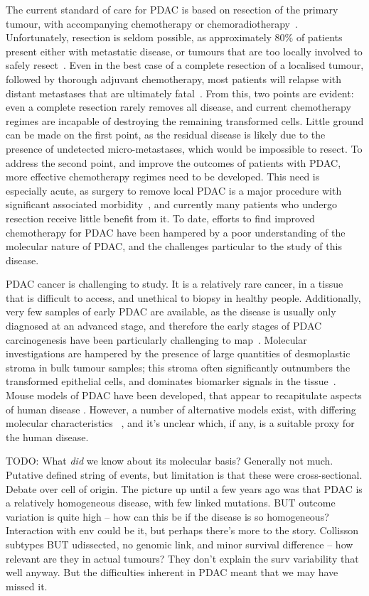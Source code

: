 \documentclass[thesis.tex]{subfiles}
\begin{document}
The current standard of care for \gls{PDAC} is based on resection of the primary tumour, with accompanying chemotherapy or chemoradiotherapy~\cite{Editors2015}.  Unfortunately, resection is seldom possible, as approximately $80\%$ of patients present either with metastatic disease, or tumours that are too locally involved to safely resect~\cite{TODO}.  Even in the best case of a complete resection of a localised tumour, followed by thorough adjuvant chemotherapy, most patients will relapse with distant metastases that are ultimately fatal~\cite{Barugola2007}.  From this, two points are evident: even a complete resection rarely removes all disease, and current chemotherapy regimes are incapable of destroying the remaining transformed cells.  Little ground can be made on the first point, as the residual disease is likely due to the presence of undetected micro-metastases, which would be impossible to resect.  To address the second point, and improve the outcomes of patients with \gls{PDAC}, more effective chemotherapy regimes need to be developed.  This need is especially acute, as surgery to remove local \gls{PDAC} is a major procedure with significant associated morbidity~\cite{Ho2005}, and currently many patients who undergo resection receive little benefit from it.  To date, efforts to find improved chemotherapy for \gls{PDAC} have been hampered by a poor understanding of the molecular nature of \gls{PDAC}, and the challenges particular to the study of this disease.

\gls{PDAC} cancer is challenging to study.  It is a relatively rare cancer, in a tissue that is difficult to access, and unethical to biopsy in healthy people.  Additionally, very few samples of early \gls{PDAC} are available, as the disease is usually only diagnosed at an advanced stage, and therefore the early stages of \gls{PDAC} carcinogenesis have been particularly challenging to map~\cite{TODO}.  Molecular investigations are hampered by the presence of large quantities of desmoplastic stroma in bulk tumour samples; this stroma often significantly outnumbers the transformed epithelial cells, and dominates biomarker signals in the tissue~\cite{Collisson2011}.  Mouse models of \gls{PDAC} have been developed, that appear to recapitulate aspects of human disease \cite{TODO}.  However, a number of alternative models exist, with differing molecular characteristics ~\cite{TODO}, and it's unclear which, if any, is a suitable proxy for the human disease.

TODO: What \emph{did} we know about its molecular basis?  Generally not much.  Putative defined string of events, but limitation is that these were cross-sectional.  Debate over cell of origin.  The picture up until a few years ago was that PDAC is a relatively homogeneous disease, with few linked mutations.  BUT outcome variation is quite high -- how can this be if the disease is so homogeneous?  Interaction with env could be it, but perhaps there's more to the story.  Collisson subtypes BUT udissected, no genomic link, and minor survival difference -- how relevant are they in actual tumours?  They don't explain the surv variability that well anyway.  But the difficulties inherent in PDAC meant that we may have missed it.
\end{document}

